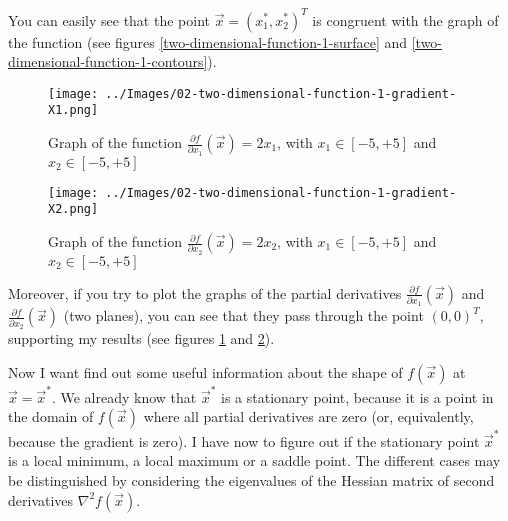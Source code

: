     You can easily see that the point \(\vec{x} = (x^{*}_{1}, x^{*}_{2})^T\) is congruent with the graph of the function (see figures \ref{two-dimensional-function-1-surface} and \ref{two-dimensional-function-1-contours}).
    \begin{figure}
        \centering
        \texttt{[image: ../Images/02-two-dimensional-function-1-gradient-X1.png]}
        \caption{Graph of the function \(\frac{\partial f}{\partial x_1}(\vec{x}) = 2x_1\), with \(x_1 \in [-5, +5]\) and \(x_2 \in [-5, +5]\)}
        \label{two-dimensional-function-1-gradient-X1}
    \end{figure}
    \begin{figure}
        \centering
        \texttt{[image: ../Images/02-two-dimensional-function-1-gradient-X2.png]}
        \caption{Graph of the function \(\frac{\partial f}{\partial x_2}(\vec{x}) = 2x_2\), with \(x_1 \in [-5, +5]\) and \(x_2 \in [-5, +5]\)}
        \label{two-dimensional-function-1-gradient-X2}
    \end{figure}
    Moreover, if you try to plot the graphs of the partial derivatives \(\frac{\partial f}{\partial x_1}(\vec{x})\) and \(\frac{\partial f}{\partial x_2}(\vec{x})\) (two planes), you can see that they pass through the point \((0, 0)^T\), supporting my results (see figures \ref{two-dimensional-function-1-gradient-X1} and \ref{two-dimensional-function-1-gradient-X2}).\par
    Now I want find out some useful information about the shape of \(f(\vec{x})\) at \(\vec{x} = \vec{x}^*\). We already know that \(\vec{x}^*\) is a stationary point, because it is a point in the domain of \(f(\vec{x})\) where all partial derivatives are zero (or, equivalently, because the gradient is zero). I have now to figure out if the stationary point \(\vec{x}^*\) is a local minimum, a local maximum or a saddle point. The different cases may be distinguished by considering the eigenvalues of the Hessian matrix of second derivatives \(\nabla^2 f(\vec{x})\).
